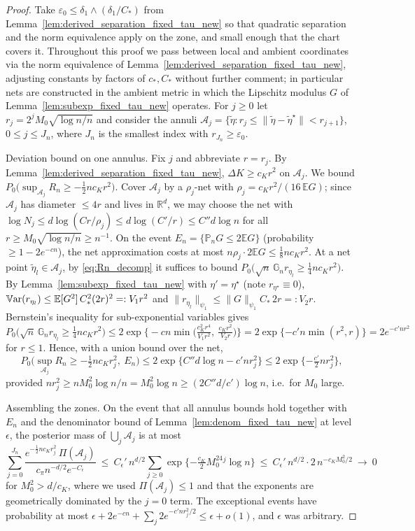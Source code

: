 \documentclass[11pt]{article}
\theoremstyle{definition}
\theoremstyle{plain}
\newcommand{\E}{\mathbb{E}}
\newcommand{\R}{\mathbb{R}}
\newcommand{\Var}{\mathbb{V}{\rm ar}}
\begin{document}
\begin{proof}
Take $\varepsilon_0\le\delta_1\wedge(\delta_1/C_\ast)$ from Lemma~\ref{lem:derived_separation_fixed_tau_new} so that quadratic separation and the norm equivalence apply on the zone, and small enough that the chart covers it. Throughout this proof we pass between local and ambient coordinates via the norm equivalence of Lemma~\ref{lem:derived_separation_fixed_tau_new}, adjusting constants by factors of $c_\ast,C_\ast$ without further comment; in particular nets are constructed in the ambient metric in which the Lipschitz modulus $G$ of Lemma~\ref{lem:subexp_fixed_tau_new} operates. For $j\ge0$ let
$r_j=2^jM_0\sqrt{\log n/n}$ and consider the annuli
$\mathcal A_j=\{\tilde\eta:r_j\le\|\tilde\eta-\tilde\eta^\star\|<r_{j+1}\}$, $0\le j\le J_n$, where $J_n$ is the smallest index with $r_{J_n}\ge\varepsilon_0$.

Deviation bound on one annulus. Fix $j$ and abbreviate $r=r_j$. By Lemma~\ref{lem:derived_separation_fixed_tau_new}, $\Delta K\ge c_Kr^2$ on $\mathcal A_j$. We bound
$P_0\big(\sup_{\mathcal A_j}R_n\ge-\tfrac12nc_Kr^2\big)$.
Cover $\mathcal A_j$ by a $\rho_j$-net with $\rho_j=c_Kr^2/(16\,\E G)$; since $\mathcal A_j$ has diameter $\le 4r$ and lives in $\R^d$, we may choose the net with
$\log N_j\le d\log(Cr/\rho_j)\le d\log(C'/r)\le C''d\log n$
for all $r\ge M_0\sqrt{\log n/n}\ge n^{-1}$. On the event $E_n=\{\mathbb P_nG\le2\E G\}$ (probability $\ge1-2e^{-cn}$), the net approximation costs at most $n\rho_j\cdot2\E G\le\tfrac18nc_Kr^2$. At a net point $\tilde\eta_l\in\mathcal A_j$, by \eqref{eq:Rn_decomp} it suffices to bound
$P_0\big(\sqrt n\,\mathbb G_nr_{\eta_l}\ge\tfrac14nc_Kr^2\big)$.
By Lemma~\ref{lem:subexp_fixed_tau_new} with $\eta'=\eta^\star$ (note $r_{\eta^\star}\equiv0$),
$\Var(r_{\eta_l})\le\E[G^2]\,C_\ast^2(2r)^2=:V_1r^2$ and $\|r_{\eta_l}\|_{\psi_1}\le\|G\|_{\psi_1}C_\ast\,2r=:V_2r$.
Bernstein's inequality for sub-exponential variables \citep[Theorem 2.8.1]{Vershynin_2018} gives
\[
P_0\Big(\sqrt n\,\mathbb G_nr_{\eta_l}\ge\tfrac14nc_Kr^2\Big)
\le2\exp\Big\{-cn\min\Big(\tfrac{c_K^2r^4}{V_1r^2},\ \tfrac{c_Kr^2}{V_2r}\Big)\Big\}
=2\exp\{-c'n\min(r^2,r)\}=2e^{-c'nr^2}
\]
for $r\le1$. Hence, with a union bound over the net,
\[
P_0\Big(\sup_{\mathcal A_j}R_n\ge-\tfrac12nc_Kr_j^2,\ E_n\Big)
\le2\exp\{C''d\log n-c'nr_j^2\}
\le2\exp\{-\tfrac{c'}{2}nr_j^2\},
\]
provided $nr_j^2\ge nM_0^2\log n/n=M_0^2\log n\ge(2C''d/c')\log n$, i.e.\ for $M_0$ large.

Assembling the zones. On the event that all annulus bounds hold together with $E_n$ and the denominator bound of Lemma~\ref{lem:denom_fixed_tau_new} at level $\epsilon$, the posterior mass of $\bigcup_j\mathcal A_j$ is at most
\[
\sum_{j=0}^{J_n}\frac{e^{-\frac12nc_Kr_j^2}\,\Pi(\mathcal A_j)}{c_\pi n^{-d/2}e^{-C_\epsilon}}
\ \le\ C_\epsilon'\,n^{d/2}\sum_{j\ge0}\exp\{-\tfrac{c_K}{2}M_0^24^j\log n\}
\ \le\ C_\epsilon'\,n^{d/2}\cdot2\,n^{-c_KM_0^2/2}\ \longrightarrow\ 0
\]
for $M_0^2>d/c_K$, where we used $\Pi(\mathcal A_j)\le1$ and that the exponents are geometrically dominated by the $j=0$ term. The exceptional events have probability at most
$\epsilon+2e^{-cn}+\sum_j2e^{-c'nr_j^2/2}\le\epsilon+o(1)$, and $\epsilon$ was arbitrary.
\end{proof}
\end{document}
